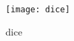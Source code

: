 \documentclass[12pt]{article}
\begin{document}
\begin{figure}[ht]
  \centering
  \texttt{[image: dice]}
  \caption{dice}
  \label{fig:dice}
\end{figure}
\end{document}
